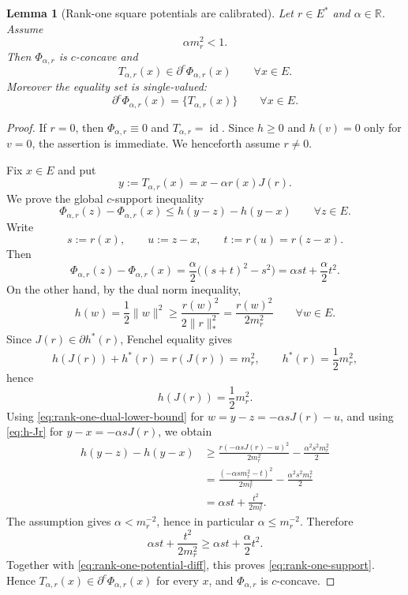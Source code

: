 \documentclass[10pt,a4paper]{amsart}
\numberwithin{equation}{section}
\newtheorem{lemma}[theorem]{Lemma}
\newcommand{\R}{\mathbb{R}}
\newcommand{\id}{\operatorname{id}}
\begin{document}
	\begin{lemma}[Rank-one square potentials are calibrated]
		\label{lem:rank-one-square-calibration}
		Let \(r\in E^*\) and \(\alpha\in\R\). Assume
		\begin{equation}\label{eq:rank-one-admissibility}
			\alpha m_r^2<1.
		\end{equation}
		Then \(\Phi_{\alpha,r}\) is \(c\)-concave and
		\[
		T_{\alpha,r}(x)\in\partial^c\Phi_{\alpha,r}(x)
		\qquad\forall x\in E.
		\]
		Moreover the equality set is single-valued:
		\[
		\partial^c\Phi_{\alpha,r}(x)=\{T_{\alpha,r}(x)\}
		\qquad\forall x\in E.
		\]
	\end{lemma}
	
	\begin{proof}
		If \(r=0\), then \(\Phi_{\alpha,r}\equiv0\) and \(T_{\alpha,r}=\id\). Since
		\(h\ge0\) and \(h(v)=0\) only for \(v=0\), the assertion is immediate. We henceforth
		assume \(r\ne0\).
		
		Fix \(x\in E\) and put
		\[
		y:=T_{\alpha,r}(x)=x-\alpha r(x)J(r).
		\]
		We prove the global \(c\)-support inequality
		\begin{equation}\label{eq:rank-one-support}
			\Phi_{\alpha,r}(z)-\Phi_{\alpha,r}(x)
			\le h(y-z)-h(y-x)
			\qquad\forall z\in E.
		\end{equation}
		Write
		\[
		s:=r(x),
		\qquad
		u:=z-x,
		\qquad
		t:=r(u)=r(z-x).
		\]
		Then
		\begin{equation}\label{eq:rank-one-potential-diff}
			\Phi_{\alpha,r}(z)-\Phi_{\alpha,r}(x)
			=\frac{\alpha}{2}\bigl((s+t)^2-s^2\bigr)
			=\alpha st+\frac{\alpha}{2}t^2.
		\end{equation}
		On the other hand, by the dual norm inequality,
		\begin{equation}\label{eq:rank-one-dual-lower-bound}
			h(w)=\frac12\|w\|^2
			\ge \frac{r(w)^2}{2\|r\|_*^2}
			=\frac{r(w)^2}{2m_r^2}
			\qquad\forall w\in E.
		\end{equation}
		Since \(J(r)\in\partial h^*(r)\), Fenchel equality gives
		\[
		h(J(r))+h^*(r)=r(J(r))=m_r^2,
		\qquad h^*(r)=\frac12m_r^2,
		\]
		hence
		\begin{equation}\label{eq:h-Jr}
			h(J(r))=\frac12m_r^2.
		\end{equation}
		Using \eqref{eq:rank-one-dual-lower-bound} for \(w=y-z=-\alpha sJ(r)-u\), and
		using \eqref{eq:h-Jr} for \(y-x=-\alpha sJ(r)\), we obtain
		\[
		\begin{aligned}
			h(y-z)-h(y-x)
			&\ge
			\frac{r(-\alpha sJ(r)-u)^2}{2m_r^2}
			-\frac{\alpha^2s^2m_r^2}{2} \\
			&=
			\frac{(-\alpha sm_r^2-t)^2}{2m_r^2}
			-\frac{\alpha^2s^2m_r^2}{2} \\
			&=
			\alpha st+\frac{t^2}{2m_r^2}.
		\end{aligned}
		\]
		The assumption gives \(\alpha<m_r^{-2}\), hence in particular \(\alpha\le m_r^{-2}\).
		Therefore
		\[
		\alpha st+\frac{t^2}{2m_r^2}
		\ge
		\alpha st+\frac{\alpha}{2}t^2.
		\]
		Together with \eqref{eq:rank-one-potential-diff}, this proves
		\eqref{eq:rank-one-support}. Hence
		\(T_{\alpha,r}(x)\in\partial^c\Phi_{\alpha,r}(x)\) for every \(x\), and
		\(\Phi_{\alpha,r}\) is \(c\)-concave.
		

\end{proof}
\end{document}
